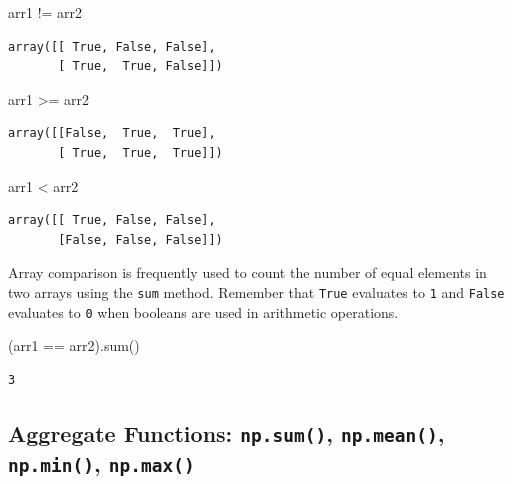 \documentclass[
  letterpaper,
  DIV=11,
  numbers=noendperiod]{scrreprt}
\newenvironment{Shaded}{\begin{snugshade}}{\end{snugshade}}
\newcommand{\BuiltInTok}[1]{\textcolor[rgb]{0.00,0.23,0.31}{#1}}
\newcommand{\NormalTok}[1]{\textcolor[rgb]{0.00,0.23,0.31}{#1}}
\newcommand{\OperatorTok}[1]{\textcolor[rgb]{0.37,0.37,0.37}{#1}}
\begin{document}
\begin{Shaded}
\begin{Highlighting}[]
\NormalTok{arr1 }\OperatorTok{!=}\NormalTok{ arr2}
\end{Highlighting}
\end{Shaded}

\begin{verbatim}
array([[ True, False, False],
       [ True,  True, False]])
\end{verbatim}

\begin{Shaded}
\begin{Highlighting}[]
\NormalTok{arr1 }\OperatorTok{\textgreater{}=}\NormalTok{ arr2}
\end{Highlighting}
\end{Shaded}

\begin{verbatim}
array([[False,  True,  True],
       [ True,  True,  True]])
\end{verbatim}

\begin{Shaded}
\begin{Highlighting}[]
\NormalTok{arr1 }\OperatorTok{\textless{}}\NormalTok{ arr2}
\end{Highlighting}
\end{Shaded}

\begin{verbatim}
array([[ True, False, False],
       [False, False, False]])
\end{verbatim}

Array comparison is frequently used to count the number of equal
elements in two arrays using the \texttt{sum} method. Remember that
\texttt{True} evaluates to \texttt{1} and \texttt{False} evaluates to
\texttt{0} when booleans are used in arithmetic operations.

\begin{Shaded}
\begin{Highlighting}[]
\NormalTok{(arr1 }\OperatorTok{==}\NormalTok{ arr2).}\BuiltInTok{sum}\NormalTok{()}
\end{Highlighting}
\end{Shaded}

\begin{verbatim}
3
\end{verbatim}

\hypertarget{aggregate-functions-np.sum-np.mean-np.min-np.max}{%
\subsection{\texorpdfstring{Aggregate Functions: \texttt{np.sum()},
\texttt{np.mean()}, \texttt{np.min()},
\texttt{np.max()}}{Aggregate Functions: np.sum(), np.mean(), np.min(), np.max()}}\label{aggregate-functions-np.sum-np.mean-np.min-np.max}}
\end{document}

